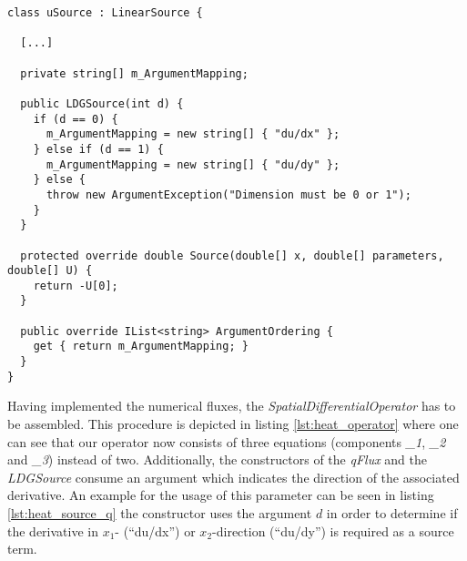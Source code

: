 \begin{lstlisting}[caption=BoSSS implementation of the right hand side of
equation \ref{eq:heat_q_equation2}, label=lst:heat_source_q]
class uSource : LinearSource {
  
  [...]
  
  private string[] m_ArgumentMapping;
  
  public LDGSource(int d) {
    if (d == 0) {
      m_ArgumentMapping = new string[] { "du/dx" };
    } else if (d == 1) {
      m_ArgumentMapping = new string[] { "du/dy" };
    } else {
      throw new ArgumentException("Dimension must be 0 or 1");
    }
  }
  
  protected override double Source(double[] x, double[] parameters, double[] U) {
    return -U[0];
  }
  
  public override IList<string> ArgumentOrdering {
    get { return m_ArgumentMapping; }
  }
}
\end{lstlisting}

Having implemented the numerical fluxes, the 
\emph{SpatialDifferentialOperator} has to be assembled. This procedure is 
depicted in listing \ref{lst:heat_operator} where one can see that our operator
now consists of three equations (components \emph{\_1}, \emph{\_2} and 
\emph{\_3}) instead of two. Additionally, the constructors of the \emph{qFlux} 
and the \emph{LDGSource} consume an argument which indicates the direction of 
the associated derivative. An example for the usage of this parameter can be 
seen in listing \ref{lst:heat_source_q} the constructor uses the argument $d$
in order to determine if the derivative in $x_1$- ("`du/dx"') or 
$x_2$-direction ("`du/dy"') is required as a source term.
